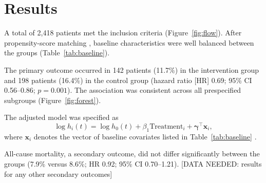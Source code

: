 \section{Results}
\label{sec:results}

A total of 2,418 patients met the inclusion criteria (Figure~\ref{fig:flow}). After propensity-score matching \cite{austin2011introduction}, baseline characteristics were well balanced between the groups (Table~\ref{tab:baseline}).

The primary outcome occurred in 142 patients (11.7\%) in the intervention group and 198 patients (16.4\%) in the control group (hazard ratio [HR] 0.69; 95\% CI 0.56--0.86; $p = 0.001$). The association was consistent across all prespecified subgroups (Figure~\ref{fig:forest}).

The adjusted model was specified as
\begin{equation}
  \log h_i(t) = \log h_0(t) + \beta_1 \text{Treatment}_i + \boldsymbol{\gamma}^\top \mathbf{x}_i ,
  \label{eq:cox}
\end{equation}
where $\mathbf{x}_i$ denotes the vector of baseline covariates listed in Table~\ref{tab:baseline} \cite{cox1972regression, therneau2000modeling}.

All-cause mortality, a secondary outcome, did not differ significantly between the groups (7.9\% versus 8.6\%; HR 0.92; 95\% CI 0.70--1.21). [DATA NEEDED: results for any other secondary outcomes]
